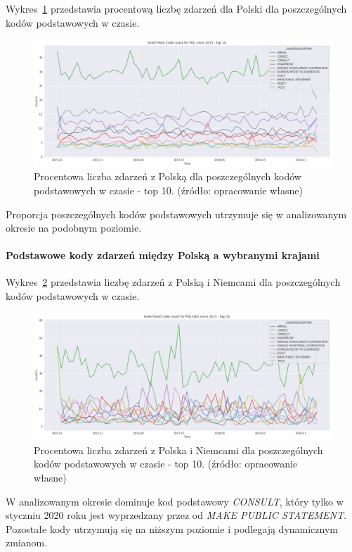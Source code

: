 \documentclass[11pt]{report}
\begin{document}
    Wykres~\ref{fig:PLPERCpercinTIME} przedstawia procentową liczbę zdarzeń dla Polski dla poszczególnych kodów podstawowych w czasie.
    \begin{figure}[!htp]
        \centering
        \includegraphics[width=\linewidth]{fig/PL/PLERCpercinTIME.png}
        \caption{Procentowa liczba zdarzeń z Polską dla poszczególnych kodów podstawowych w czasie - top 10. (źródło: opracowanie własne)}
        \label{fig:PLPERCpercinTIME}
    \end{figure}
    Proporcja poszczególnych kodów podstawowych utrzymuje się w analizowanym okresie na podobnym poziomie.

    \paragraph{Podstawowe kody zdarzeń między Polską a wybranymi krajami}

    Wykres~\ref{fig:PLDEUERC} przedstawia liczbę zdarzeń z Polską i Niemcami dla poszczególnych kodów podstawowych w czasie.
    \begin{figure}[!htp]
        \centering
        \includegraphics[width=\linewidth]{fig/PL/POLDEUERCperc.png}
        \caption{Procentowa liczba zdarzeń z Polska i Niemcami dla poszczególnych kodów podstawowych w czasie - top 10. (źródło: opracowanie własne)}
        \label{fig:PLDEUERC}
    \end{figure}
    W analizowanym okresie dominuje kod podstawowy \textit{CONSULT}, który tylko w styczniu 2020 roku jest wyprzedzany przez od \textit{MAKE PUBLIC STATEMENT}.
    Pozostałe kody utrzymują się na niższym poziomie i podlegają dynamicznym zmianom.
\end{document}
